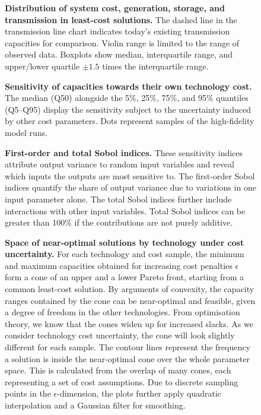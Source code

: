 \begin{figure}[H]
    \caption{ {\bf Distribution of system cost, generation, storage, and transmission
      in least-cost solutions.} The dashed line in the transmission line chart
      indicates today's existing transmission capacities for comparison. Violin
      range is limited to the range of observed data. Boxplots show median,
      interquartile range, and upper/lower quartile $\pm 1.5$ times the
      interquartile range. }
    \label{fig:violin}
\end{figure}


\begin{figure}[H]
    \caption{ { \bf Sensitivity of capacities towards their own technology cost.} The
      median (Q50) alongside the 5\%, 25\%, 75\%, and 95\% quantiles (Q5--Q95)
      display the sensitivity subject to the uncertainty induced by other cost
      parameters. Dots represent samples of the high-fidelity model runs. }
    \label{fig:sensitivity}
\end{figure}

\begin{figure}[H]
    \caption{ {\bf First-order and total Sobol indices.} These
      sensitivity indices attribute output variance to random input variables
      and reveal which inputs the outputs are most sensitive to. The first-order
      Sobol indices quantify the share of output variance due to variations in
      one input parameter alone. The total Sobol indices further include
      interactions with other input variables. Total Sobol indices can be
      greater than 100\% if the contributions are not purely additive. }
    \label{fig:sobol}
\end{figure}


\begin{figure}[H]
    \caption{ { \bf Space of near-optimal solutions by technology under cost
    uncertainty. } For each technology and cost sample, the minimum and maximum
    capacities obtained for increasing cost penalties $\epsilon$ form a cone of
    an upper and a lower Pareto front, starting from a common least-cost
    solution. By arguments of convexity, the capacity ranges contained by the
    cone can be near-optimal and feasible, given a degree of freedom in the
    other technologies. From optimisation theory, we know that the cones widen
    up for increased slacks. As we consider technology cost uncertainty, the
    cone will look slightly different for each sample. The contour lines
    represent the frequency a solution is inside the near-optimal cone over the
    whole parameter space. This is calculated from the overlap of many cones,
    each representing a set of cost assumptions. Due to discrete sampling points
    in the $\epsilon$-dimension, the plots further apply quadratic interpolation
    and a Gaussian filter for smoothing. }
    \label{fig:fuzzycone}
\end{figure}


